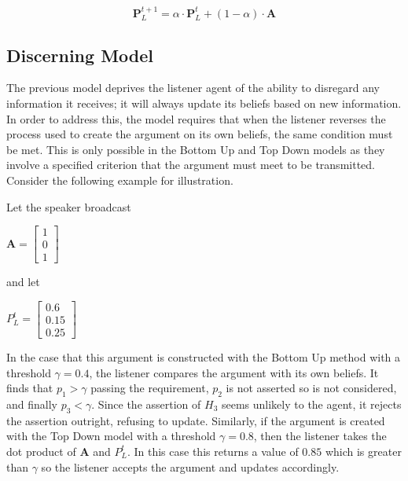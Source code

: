 \begin{equation} 
    \mathbf{P}^{t+1}_L = \alpha \cdot \mathbf{P}^{t}_L + (1 - \alpha) \cdot \mathbf{A} 
\end{equation}


\subsection*{Discerning Model}

The previous model deprives the listener agent of the ability to disregard any information it receives; it will always update its beliefs based on new information. In order to address this, the model requires that when the listener reverses the process used to create the argument on its own beliefs, the same condition must be met. This is only possible in the Bottom Up and Top Down models as they involve a specified criterion that the argument must meet to be transmitted. Consider the following example for illustration. 

Let the speaker broadcast \hspace{10em}

\begin{minipage}[ht]{0.45\textwidth}
\begin{center}
$\mathbf{A} = \begin{bmatrix}
    1\\
    0\\
    1
\end{bmatrix}$
\end{center}
\end{minipage}
and let
\begin{minipage}[ht]{0.45\textwidth} 
$P^t_L = \begin{bmatrix}
    0.6\\
    0.15\\
    0.25
\end{bmatrix}$
\end{minipage}

In the case that this argument is constructed with the Bottom Up method with a threshold $\gamma = 0.4$, the listener compares the argument with its own beliefs. It finds that $p_1 > \gamma$ passing the requirement, $p_2$ is not asserted so is not considered, and finally $p_3 < \gamma$. Since the assertion of $H_3$ seems unlikely to the agent, it rejects the assertion outright, refusing to update. Similarly, if the argument is created with the Top Down model with a threshold $\gamma = 0.8$, then the listener takes the dot product of $\mathbf{A}$ and $P_L^t$. In this case this returns a value of $0.85$ which is greater than $\gamma$ so the listener accepts the argument and updates accordingly. 


